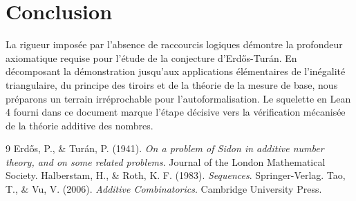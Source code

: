 \section{Conclusion}
La rigueur imposée par l'absence de raccourcis logiques démontre la profondeur axiomatique requise pour l'étude de la conjecture d'Erdős-Turán. En décomposant la démonstration jusqu'aux applications élémentaires de l'inégalité triangulaire, du principe des tiroirs et de la théorie de la mesure de base, nous préparons un terrain irréprochable pour l'autoformalisation. Le squelette en Lean 4 fourni dans ce document marque l'étape décisive vers la vérification mécanisée de la théorie additive des nombres.

\newpage
\begin{thebibliography}{9}
 Erdős, P., \& Turán, P. (1941). \textit{On a problem of Sidon in additive number theory, and on some related problems}. Journal of the London Mathematical Society.
 Halberstam, H., \& Roth, K. F. (1983). \textit{Sequences}. Springer-Verlag.
 Tao, T., \& Vu, V. (2006). \textit{Additive Combinatorics}. Cambridge University Press.
\end{thebibliography}


